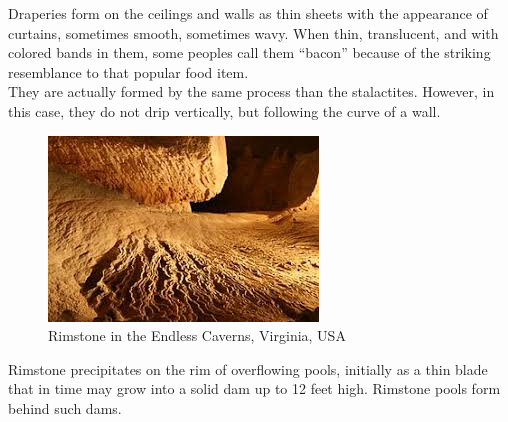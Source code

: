 \documentclass[draft, final]{report}
\begin{document}
Draperies form on the ceilings and walls as thin sheets with the appearance of curtains, sometimes smooth, sometimes wavy. When thin, translucent, and with colored bands in them, some peoples call them ``bacon'' because of the striking resemblance to that popular food item.\\

They are actually formed by the same process than the stalactites. However, in this case, they do not drip vertically, but following the curve of a wall.\\
\begin{figure}[!ht]
  \centering
  \includegraphics[scale=1]{LateX/Images/rimstone.jpg}
  \caption{Rimstone in the Endless Caverns, Virginia, USA\cite{caverimstone}}
\end{figure}


Rimstone precipitates on the rim of overflowing pools, initially as a thin blade that in time may grow into a solid dam up to 12 feet high. Rimstone pools form behind such dams.\\
\end{document}
